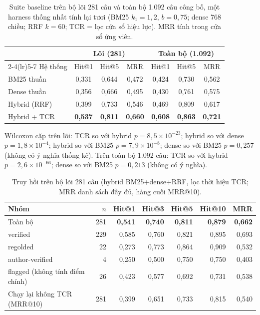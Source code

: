 \documentclass[11pt,a4paper]{article}
\begin{document}
\begin{table}[t]
\centering\small
\caption{Suite baseline trên bộ lõi 281 câu và toàn bộ 1.092 câu công bố, một harness thống nhất tính lại tươi (BM25 $k_1{=}1{,}2$, $b{=}0{,}75$; dense 768 chiều; RRF $k{=}60$; TCR = lọc cửa sổ hiệu lực). MRR tính trong cửa sổ ứng viên.}
\label{tab:baselines-vn}
\setlength{\tabcolsep}{3.4pt}
\begin{tabular}{l ccc ccc}
\toprule
 & \multicolumn{3}{c}{Lõi (281)} & \multicolumn{3}{c}{Toàn bộ (1.092)} \\
\cmidrule(lr){2-4}\cmidrule(lr){5-7}
Hệ thống & Hit@1 & Hit@5 & MRR & Hit@1 & Hit@5 & MRR \\
\midrule
BM25 thuần & 0,331 & 0,644 & 0,472 & 0,424 & 0,730 & 0,562 \\
Dense thuần & 0,356 & 0,666 & 0,495 & 0,430 & 0,761 & 0,575 \\
Hybrid (RRF) & 0,399 & 0,733 & 0,546 & 0,469 & 0,809 & 0,617 \\
Hybrid + TCR & \textbf{0,537} & \textbf{0,811} & \textbf{0,660} & \textbf{0,608} & \textbf{0,863} & \textbf{0,721} \\
\bottomrule
\end{tabular}

\smallskip
{\footnotesize Wilcoxon cặp trên lõi: TCR so với hybrid $p=8{,}5\times10^{-23}$; hybrid so với dense $p=1{,}8\times10^{-4}$; hybrid so với BM25 $p=7{,}9\times10^{-8}$; dense so với BM25 $p=0{,}257$ (không có ý nghĩa thống kê). Trên toàn bộ 1.092 câu: TCR so với hybrid $p=2{,}6\times10^{-66}$; dense so với BM25 $p=0{,}213$ (không có ý nghĩa).}
\end{table}

\begin{table}[t]
\centering\small
\caption{Truy hồi trên bộ lõi 281 câu (hybrid BM25+dense+RRF, lọc thời hiệu TCR; MRR danh sách đầy đủ, hàng cuối MRR@10).}
\label{tab:core-retrieval}
\setlength{\tabcolsep}{3.6pt}
\begin{tabular}{lrrrrrr}
\toprule
Nhóm & $n$ & Hit@1 & Hit@3 & Hit@5 & Hit@10 & MRR \\
\midrule
Toàn bộ & 281 & \textbf{0,541} & \textbf{0,740} & \textbf{0,811} & \textbf{0,879} & \textbf{0,662} \\
\quad verified & 229 & 0,585 & 0,760 & 0,821 & 0,895 & 0,693 \\
\quad regolded & 22 & 0,273 & 0,773 & 0,864 & 0,909 & 0,532 \\
\quad author-verified & 4 & 0,250 & 0,500 & 0,750 & 0,750 & 0,403 \\
\quad flagged (không tính điểm chính) & 26 & 0,423 & 0,577 & 0,692 & 0,731 & 0,538 \\
\midrule
Chạy lại không TCR (MRR@10) & 281 & 0,399 & 0,651 & 0,733 & 0,815 & 0,540 \\
\bottomrule
\end{tabular}
\end{table}
\end{document}
